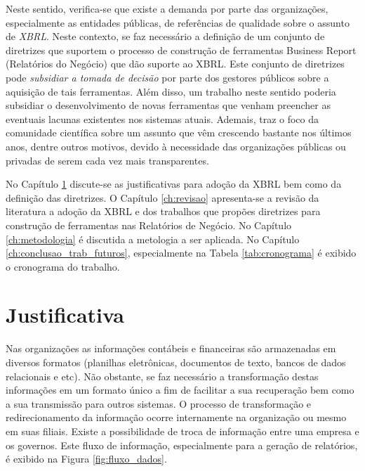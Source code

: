 \documentclass[msc,proposal,hidelot,hideabstract]{ppgccufmg} %
\begin{document}
Neste sentido, verifica-se que existe a demanda por parte das organizações,
especialmente as entidades públicas, de referências de qualidade sobre o
assunto de \textit{XBRL}. Neste contexto, se faz necessário a definição de um
conjunto de diretrizes que suportem o processo de construção de ferramentas
Business Report (Relatórios do Negócio)  que dão suporte ao XBRL. Este
conjunto de diretrizes pode \textit{subsidiar a tomada de decisão} por parte
dos gestores públicos sobre a aquisição de tais ferramentas.
Além disso, um trabalho neste sentido poderia subsidiar o desenvolvimento de novas ferramentas que venham preencher as eventuais lacunas existentes nos sistemas atuais. Ademais, traz o foco da comunidade científica sobre um assunto que vêm crescendo bastante nos últimos anos, dentre outros motivos, devido à necessidade das organizações públicas ou privadas de serem cada vez mais transparentes.


No Capítulo \ref{ch:justificativa} discute-se as justificativas para adoção da
XBRL bem como da definição das diretrizes. O Capítulo \ref{ch:revisao}
apresenta-se a revisão da literatura a adoção da XBRL e dos trabalhos que
propões diretrizes para construção de ferramentas nas Relatórios de Negócio. No
Capítulo \ref{ch:metodologia} é discutida a metologia a ser aplicada. No
Capítulo \ref{ch:conclusao_trab_futuros}, especialmente na Tabela \ref{tab:cronograma} é exibido o cronograma do trabalho.

\chapter{Justificativa}
\label{ch:justificativa}

Nas organizações as informações contábeis e financeiras são armazenadas em
diversos formatos (planilhas eletrônicas, documentos de texto, bancos de dados
relacionais e etc).
Não obstante, se faz necessário a transformação destas informações em um
formato único a fim de facilitar a sua recuperação bem como a sua transmissão
para outros sistemas.
 O processo de transformação e redirecionamento da informação ocorre
 internamente na organização ou mesmo em suas filiais. Existe a possibilidade
 de troca de informação entre uma empresa e os governos. Este fluxo de informação, especialmente para a geração de relatórios, é exibido na Figura \ref{fig:fluxo_dados}.
\end{document}
